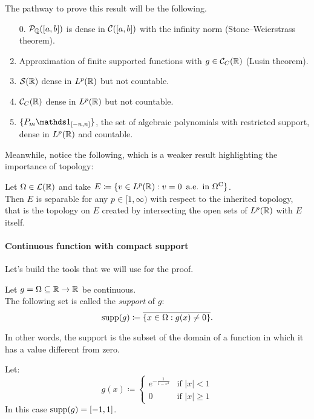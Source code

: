 The pathway to prove this result will be the following.
\begin{enumerate}
\item[0.] $\mathcal P_{\mathbb Q}([a,b])$ is dense in $\mathcal C([a,b])$ with the infinity norm (Stone--Weierstrass theorem).
\item Approximation of finite supported functions with $g\in \mathcal C_C(\mathbb R)$ (Lusin theorem).
\item $\mathcal S(\mathbb R)$ dense in $L^p(\mathbb R)$ but not countable.
\item $\mathcal C_C(\mathbb R)$ dense in $L^p(\mathbb R)$ but not countable.
\item $\{P_m\Ind_{[-n,n]}\}$, the set of algebraic polynomials with restricted support, dense in $L^p(\mathbb R)$ and countable.
\end{enumerate}

Meanwhile, notice the following, which is a weaker result highlighting the importance of topology:
\begin{prop}
	Let $\Omega \in \mathcal L(\mathbb R)$ and take $E \coloneqq \{v \in L^p(\mathbb R): v=0 \enspace \text{a.e. in }\Omega^{\mathrm{C}}\}$. \\
	Then $E$ is separable for any $p \in [1,\infty)$ with respect to the inherited topology, that is the topology on $E$ created by intersecting the open sets of $L^p(\mathbb R)$ with $E$ itself.
\end{prop}


\paragraph{Continuous function with compact support} Let's build the tools that we will use for the proof.

\begin{defn}
	Let $g = \Omega \subseteq \mathbb R \to \mathbb R$ be continuous.\\
	The following set is called the \emph{support} of $g$:
	$$\operatorname*{supp}(g) \coloneqq \overline{\{x \in \Omega: g(x) \neq 0\}}.$$
\end{defn}
In other words, the support is the subset of the domain of a function in which it has a value different from zero.

\begin{exam}
	Let: $$g(x) \coloneqq \begin{cases}
	e^{-\frac{1}{1-x^2}} & \text{if }|x| < 1 \\
	0 & \text{if }|x| \geq 1
	\end{cases}$$
	In this case $\operatorname*{supp}(g) = [-1,1]$.
\end{exam}

